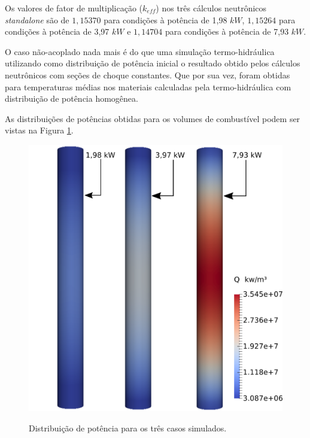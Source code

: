 Os valores de fator de multiplicação ($k_{eff}$) nos três cálculos neutrônicos \textit{standalone} são
de $1,15370$ para condições à potência de 1,98 $kW$, $1,15264$ para condições à potência de 3,97 $kW$ e
$1,14704$ para condições à potência de 7,93 $kW$.

O caso não-acoplado nada mais é do que uma simulação termo-hidráulica utilizando como distribuição de potência
inicial o resultado obtido pelos cálculos neutrônicos com seções de choque constantes. Que por sua vez, foram
obtidas para temperaturas médias nos materiais calculadas pela termo-hidráulica com distribuição de potência
homogênea.

As distribuições de potências obtidas para os volumes de combustível podem ser vistas na Figura \ref{fig:pot-nc}.

\begin{figure}[htb]
  \caption[Distribuição de potência para os três casos simulados.]{Distribuição de potência para os três casos simulados.}
  \centering\includegraphics[scale=0.5]{figuras/Q_fuel_all_NC.png}
  \label{fig:pot-nc}
\end{figure}

